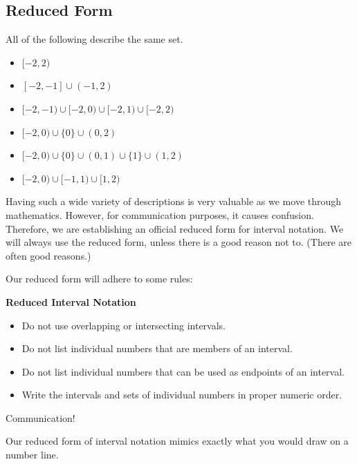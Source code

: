 \documentclass{ximera}
\begin{document}
\subsection*{Reduced Form}

All of the following describe the same set.

\begin{itemize}
\item $[-2, 2)$
\item $[-2, -1] \cup (-1, 2)$
\item $[-2, -1) \cup [-2, 0) \cup [-2, 1) \cup [-2, 2)$
\item $[-2, 0) \cup \{ 0 \} \cup (0, 2)$
\item $[-2, 0) \cup \{ 0 \} \cup (0, 1) \cup \{ 1 \} \cup (1, 2)$
\item $[-2, 0) \cup [-1, 1) \cup [1, 2)$
\end{itemize}

Having such a wide variety of descriptions is very valuable as we move through mathematics.  However, for communication purposes, it causes confusion. Therefore, we are establishing an official reduced form for interval notation.  We will always use the reduced form, unless there is a good reason not to.  (There are often good reasons.)

Our reduced form will adhere to some rules:





\begin{notation} \textbf{\textcolor{red!50!green}{Reduced Interval Notation}} 

\begin{itemize}
\item Do not use overlapping or intersecting intervals.
\item Do not list individual numbers that are members of an interval.
\item Do not list individual numbers that can be used as endpoints of an interval.
\item Write the intervals and sets of individual numbers in proper numeric order.
\end{itemize}

\end{notation}
Communication!

Our reduced form of interval notation mimics exactly what you would draw on a number line.
\end{document}
